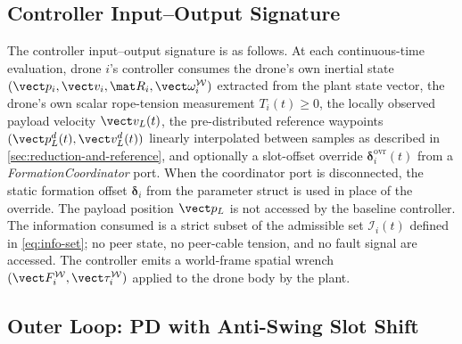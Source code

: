 \subsection{Controller Input--Output Signature}
\label{sec:ctrl-signature}

The controller input--output signature is as follows. At each continuous-time evaluation, drone $i$'s controller consumes the drone's own inertial state $(\vect p_i, \vect v_i, \mat R_i, \vect\omega_i^{\mathcal{W}})$ extracted from the plant state vector, the drone's own scalar rope-tension measurement $T_i(t) \ge 0$, the locally observed payload velocity $\vect v_L(t)$, the pre-distributed reference waypoints $(\vect p_L^d(t), \vect v_L^d(t))$ linearly interpolated between samples as described in \cref{sec:reduction-and-reference}, and optionally a slot-offset override $\boldsymbol\delta_i^{\mathrm{ovr}}(t)$ from a \textit{FormationCoordinator} port. When the coordinator port is disconnected, the static formation offset $\boldsymbol\delta_i$ from the parameter struct is used in place of the override. The payload position $\vect p_L$ is not accessed by the baseline controller. The information consumed is a strict subset of the admissible set $\mathcal{I}_i(t)$ defined in \eqref{eq:info-set}; no peer state, no peer-cable tension, and no fault signal are accessed. The controller emits a world-frame spatial wrench $(\vect F_i^{\mathcal{W}}, \vect\tau_i^{\mathcal{W}})$ applied to the drone body by the plant.

\subsection{Outer Loop: PD with Anti-Swing Slot Shift}
\label{sec:outer-loop}

